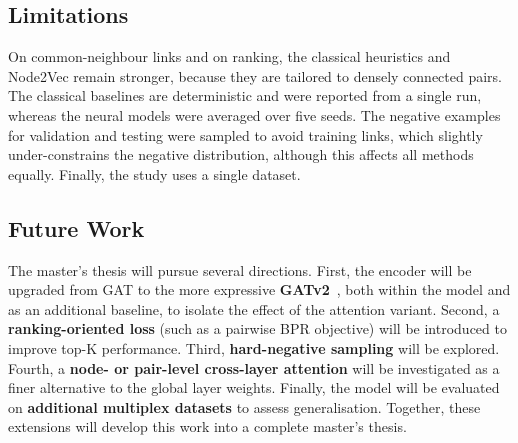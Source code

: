 \documentclass[11pt,a4paper]{article}
\begin{document}
\subsection{Limitations}
On common-neighbour links and on ranking, the classical heuristics and Node2Vec remain stronger,
because they are tailored to densely connected pairs. The classical baselines are deterministic and
were reported from a single run, whereas the neural models were averaged over five seeds. The
negative examples for validation and testing were sampled to avoid training links, which slightly
under-constrains the negative distribution, although this affects all methods equally. Finally, the
study uses a single dataset.

\subsection{Future Work}
The master's thesis will pursue several directions. First, the encoder will be upgraded from GAT to
the more expressive \textbf{GATv2}~\cite{gatv2}, both within the model and as an additional baseline,
to isolate the effect of the attention variant. Second, a \textbf{ranking-oriented loss} (such as a
pairwise BPR objective) will be introduced to improve top-K performance. Third,
\textbf{hard-negative sampling} will be explored. Fourth, a \textbf{node- or pair-level cross-layer
attention} will be investigated as a finer alternative to the global layer weights. Finally, the
model will be evaluated on \textbf{additional multiplex datasets} to assess generalisation. Together,
these extensions will develop this work into a complete master's thesis.
\end{document}
